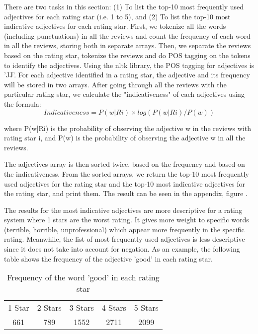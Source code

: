 There are two tasks in this section: (1) To list the top-10 most frequently used adjectives for each rating star (i.e. 1 to 5), and (2) To list the top-10 most indicative adjectives for each rating star. First, we tokenize all the words (including punctuations) in all the reviews and count the frequency of each word in all the reviews, storing both in separate arrays. Then, we separate the reviews based on the rating star, tokenize the reviews and do POS tagging on the tokens to identify the adjectives. Using the nltk library, the POS tagging for adjectives is 'JJ'. For each adjective identified in a rating star, the adjective and its frequency will be stored in two arrays. After going through all the reviews with the particular rating star, we calculate the "indicativeness" of each adjectives using the formula:
    \begin{equation}
        Indicativeness = P(w|Ri)×log(P(w|Ri)/P(w))
    \end{equation}
    
    where P(w|Ri) is the probability of observing the adjective w in the reviews with rating star i, and P(w) is the probability of observing the adjective w in all the reviews.
    
The adjectives array is then sorted twice, based on the frequency and based on the indicativeness. From the sorted arrays, we return the top-10 most frequently used adjectives for the rating star and the top-10 most indicative adjectives for the rating star, and print them. The result can be seen in the appendix, figure .

The results for the most indicative adjectives are more descriptive for a rating system where 1 stars are the worst rating. It gives more weight to specific words (terrible, horrible, unprofessional) which appear more frequently in the specific rating. Meanwhile, the list of most frequently used adjectives is less descriptive since it does not take into account for negation. As an example, the following table shows the frequency of the adjective 'good' in each rating star.

    \begin{center}
        \begin{table}[!h]
        \caption{Frequency of the word 'good' in each rating star}
            \begin{tabular}{c c c c c}
                1 Star & 2 Stars & 3 Stars & 4 Stars & 5 Stars\\
                661 & 789 & 1552 & 2711 & 2099\\
            \end{tabular}
        \end{table}
    \end{center}
    
